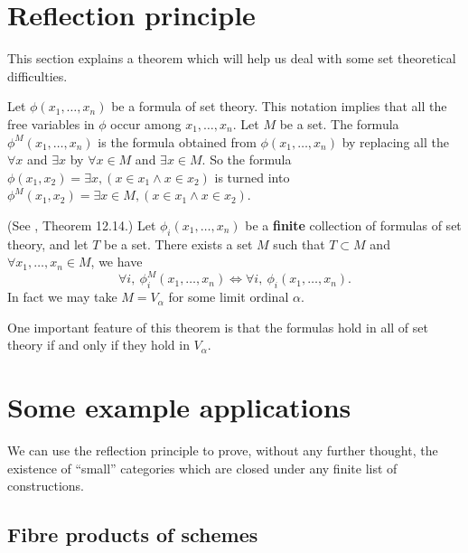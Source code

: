 \section{Reflection principle}
\label{section-reflection-principle}

\noindent
This section explains a theorem which will help us deal with some
set theoretical difficulties. 

\medskip\noindent
Let $\phi(x_1,\ldots,x_n)$ be a formula of set theory.
This notation implies that all the free variables in $\phi$
occur among $x_1,\ldots,x_n$. Let $M$ be a set.
The formula $\phi^M(x_1,\ldots,x_n)$ is the formula obtained 
from $\phi(x_1,\ldots,x_n)$ by replacing all the
$\forall x$ and $\exists x$ by $\forall x\in M$ and $\exists x\in M$.
So the formula
$\phi(x_1,x_2) = \exists x, (x\in x_1 \wedge x\in x_2)$
is turned  into
$\phi^M(x_1,x_2) = \exists x \in M, (x\in x_1 \wedge x\in x_2)$.

\begin{theorem}
\label{theorem-reflection-principle}
(See \cite{Jech}, Theorem 12.14.)
Let $\phi_i(x_1,\ldots,x_n)$ be a {\bf finite} collection of
formulas of set theory, and let $T$ be a set.
There exists a set $M$ such that
$T \subset M$ and
$\forall x_1,\ldots,x_n \in M$, we have
$$
\forall i,\  
\phi_i^{M}(x_1,\ldots,x_n)
\Leftrightarrow
\forall i,\  
\phi_i(x_1,\ldots,x_n).
$$
In fact we may take $M = V_\alpha$ for some limit ordinal $\alpha$.
\end{theorem}

\noindent
One important feature of this theorem is that the
formulas hold in all of set theory if and only if they
hold in $V_\alpha$.

\section{Some example applications}
\label{example-reflection-principle}

\noindent
We can use the reflection principle to
prove, without any further thought, the 
existence of ``small'' categories which are
closed under any finite list of constructions.

\subsection{Fibre products of schemes}

